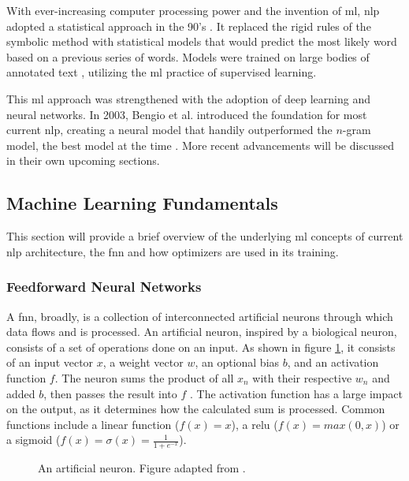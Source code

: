With ever-increasing computer processing power and the invention of \ac{ml}, \ac{nlp} adopted a statistical approach in the 90's \cite{Nadkarni.2011}.
It replaced the rigid rules of the symbolic method with statistical models that would predict the most likely word based on a previous series of words.
Models were trained on large bodies of annotated text \cite{Nadkarni.2011,Manning.1999}, utilizing the \ac{ml} practice of supervised learning.

This \ac{ml} approach was strengthened with the adoption of deep learning and neural networks.
In 2003, Bengio et al. introduced the foundation for most current \ac{nlp}, creating a neural model that handily outperformed the $n$-gram model, the best model at the time \cite{Bengio.2003}.
More recent advancements will be discussed in their own upcoming sections.

\subsection{Machine Learning Fundamentals}
\label{sec:ml}
This section will provide a brief overview of the underlying \ac{ml} concepts of current \ac{nlp} architecture, the \ac{fnn} and how optimizers are used in its training.

\subsubsection{Feedforward Neural Networks}
\label{sec:fnn}
A \ac{fnn}, broadly, is a collection of interconnected artificial neurons through which data flows and is processed.
An artificial neuron, inspired by a biological neuron, consists of a set of operations done on an input.
As shown in figure \ref{fig:neuron}, it consists of an input vector $x$, a weight vector $w$, an optional bias $b$, and an activation function $f$.
The neuron sums the product of all $x_n$ with their respective $w_n$ and added $b$, then passes the result into $f$ \cite{Jurafsky.2024}.
The activation function has a large impact on the output, as it determines how the calculated sum is processed.
Common functions include a linear function ($f(x) = x$), a \ac{relu} ($f(x) = max(0,x)$) or a sigmoid ($f(x) = \sigma(x) = \frac{1}{1+e^{-x}}$).

\begin{figure}
    \centering
    \caption{An artificial neuron. Figure adapted from \cite{Jurafsky.2024}.}
    \label{fig:neuron}
\end{figure}

